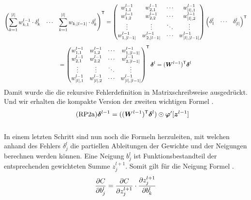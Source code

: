 \begin{appendices}
\begin{gather*}
  \begin{pmatrix} \displaystyle\sum_{k=1}^{|l|} w_{k,1}^{l-1} \cdot \delta_k^l & \cdots & \displaystyle\sum_{k=1}^{|l|} w_{k,|l-1|} \cdot \delta_k^l \end{pmatrix}^{\mathsf{T}} =
  \begin{pmatrix}
    w_{1,1}^{l-1} & w_{2,1}^{l-1} & \cdots & w_{|l|,1}^{l-1} \\
    w_{1,2}^{l-1} & w_{2,2}^{l-1} & \cdots & w_{|l|,2}^{l-1} \\
    \vdots & \vdots & \ddots & \vdots \\
    w_{1,|l-1|}^{l-1} & w_{2,|l-1|}^{l-1} & \cdots & w_{|l|,|l-1|}^{l-1}
  \end{pmatrix}
  \begin{pmatrix} \delta_1^l & \cdots & \delta_{|l|}^l \end{pmatrix}^{\mathsf{T}} \\[5pt]=
  \begin{pmatrix}
      w_{1,1}^{l-1} & w_{1,2}^{l-1} & \cdots & w_{1,|l-1|}^{l-1} \\
      w_{2,1}^{l-1} & w_{2,2}^{l-1} & \cdots & w_{2,|l-1|}^{l-1} \\
      \vdots & \vdots & \ddots & \vdots \\
      w_{|l|,1}^{l-1} & w_{|l|,2}^{l-1} & \cdots & w_{|l|,|l-1|}^{l-1}
    \end{pmatrix}^{\mathsf{T}}
  \bm{\delta}^l = (\bm{W}^{l-1})^{\mathsf{T}} \bm{\delta}^l
\end{gather*}
\para{}
Damit wurde die die rekursive Fehlerdefinition in Matrixschreibweise
ausgedrückt. Und wir erhalten die kompakte Version  der zweiten wichtigen Formel .
\\
\begin{equation}\tag{RP2a}\label{eq:RP2a}
  \bm{\delta}^{l-1} = ((\bm{W}^{l-1})^{\mathsf{T}} \bm{\delta}^l) \odot \bm{\varphi}'[\bm{z}^{l-1}]
\end{equation}
\\
In einem letzten Schritt sind nun noch die Formeln herzuleiten, mit welchen
anhand des Fehlers $\delta_j^l$ die partiellen Ableitungen der Gewichte und
der Neigungen berechnen werden können.
\para{}
Eine Neigung $b_j^l$ ist Funktionsbestandteil der entsprechenden gewichteten
Summe $z_j^{l+1}$. Somit gilt für die Neigung Formel .
\\
\begin{equation}\label{eq:RPh3}
  \partderiv{C}{b_j^l} = \partderiv{C}{z_j^{l+1}} \cdot \partderiv{z_j^{l+1}}{b_k^l}

\end{equation}
\end{appendices}
